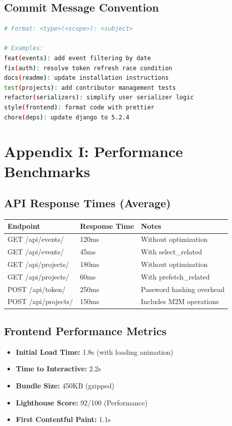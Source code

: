 \documentclass[11pt,a4paper]{article}
\begin{document}
\subsection{Commit Message Convention}
\begin{lstlisting}[language=bash]
# Format: <type>(<scope>): <subject>

# Examples:
feat(events): add event filtering by date
fix(auth): resolve token refresh race condition
docs(readme): update installation instructions
test(projects): add contributor management tests
refactor(serializers): simplify user serializer logic
style(frontend): format code with prettier
chore(deps): update django to 5.2.4
\end{lstlisting}


\section{Appendix I: Performance Benchmarks}

\subsection{API Response Times (Average)}
\begin{tabular}{|p{5cm}|p{3cm}|p{6cm}|}
\hline
\textbf{Endpoint} & \textbf{Response Time} & \textbf{Notes} \\
\hline
GET /api/events/ & 120ms & Without optimization \\
\hline
GET /api/events/ & 45ms & With select\_related \\
\hline
GET /api/projects/ & 180ms & Without optimization \\
\hline
GET /api/projects/ & 60ms & With prefetch\_related \\
\hline
POST /api/token/ & 250ms & Password hashing overhead \\
\hline
POST /api/projects/ & 150ms & Includes M2M operations \\
\hline
\end{tabular}

\subsection{Frontend Performance Metrics}
\begin{itemize}[leftmargin=*]
    \item \textbf{Initial Load Time:} 1.8s (with loading animation)
    \item \textbf{Time to Interactive:} 2.2s
    \item \textbf{Bundle Size:} 450KB (gzipped)
    \item \textbf{Lighthouse Score:} 92/100 (Performance)
    \item \textbf{First Contentful Paint:} 1.1s
\end{itemize}
\end{document}
